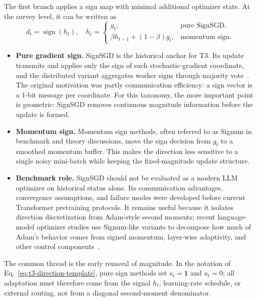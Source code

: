 The first branch applies a sign map with minimal additional optimizer state.
At the survey level, it can be written as
\begin{equation}
  d_t=\operatorname{sign}(h_t),\quad
  h_t =
  \begin{cases}
    g_t, & \text{pure SignSGD},\\
    \beta h_{t-1}+(1-\beta)g_t, & \text{momentum sign}.
  \end{cases}
  \label{eq:t3-pure-sign-template}
\end{equation}
\begin{itemize}
  \setlength{\itemsep}{2pt}
  \item \textbf{Pure gradient sign.}  SignSGD is the historical anchor for T3.
  Its update transmits and applies only the sign of each stochastic-gradient
  coordinate, and the distributed variant aggregates worker signs through
  majority vote~\citep{bernstein2018signsgd}.  The original motivation was
  partly communication efficiency: a sign vector is a 1-bit message per
  coordinate.  For this taxonomy, the more important point is geometric:
  SignSGD removes continuous magnitude information before the update is formed.
  \item \textbf{Momentum sign.}  Momentum sign methods, often referred to as
  Signum in benchmark and theory discussions, move the sign decision from
  $g_t$ to a smoothed momentum buffer.  This makes the direction less
  sensitive to a single noisy mini-batch while keeping the fixed-magnitude
  update structure.
  \item \textbf{Benchmark role.}  SignSGD should not be evaluated as a modern
  LLM optimizer on historical status alone.  Its communication advantages,
  convergence assumptions, and failure modes were developed before current
  Transformer pretraining protocols.  It remains useful because it isolates
  direction discretization from Adam-style second moments; recent
  language-model optimizer studies use Signum-like variants to decompose how
  much of Adam's behavior comes from signed momentum, layer-wise adaptivity, and
  other control components~\citep{zhao2025deconstructing}.
\end{itemize}

The common thread is the early removal of magnitude.  In the notation of
Eq.~\eqref{eq:t3-direction-template}, pure sign methods set $s_t=\mathbf{1}$
and $a_t=0$; all adaptation must therefore come from the signal $h_t$,
learning-rate schedule, or external routing, not from a diagonal second-moment
denominator.

